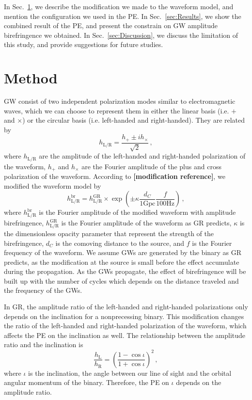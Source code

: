 \documentclass[aps,prd,twocolumn,superscriptaddress,preprintnumbers,floatfix,nofootinbib]{revtex4-2}
\begin{document}
In Sec.~\ref{sec:Method}, we describe the modification we made to the waveform
model, and mention the configuration we used in the PE. In
Sec.~\ref{sec:Results}, we show the combined result of the PE, and present the
constrain on GW amplitude birefringence we obtained. In
Sec.~\ref{sec:Discussion}, we discuss the limitation of this study, and provide
suggestions for future studies.

\section{Method}
\label{sec:Method}
GW consist of two independent polarization modes similar to electromagnetic waves,
which we can choose to represent them in either the linear basis (i.e. $+$ and $\times$)
or the circular basis (i.e. left-handed and right-handed).
They are related by
\begin{equation}
    h_{\mathrm{L/R}} = \frac{h_+ \pm i h_\times}{\sqrt{2}}\,,
\end{equation}
where $h_{\mathrm{L/R}}$ are the amplitude of the left-handed and right-handed
polarization of the waveform, $h_+$ and $h_\times$ are the Fourier amplitude of
the plus and cross polarization of the waveform. According to
\textbf{[modification reference]}, we modified the waveform model by
\begin{equation}
    h_\mathrm{L/R}^{\mathrm{br}}=
    h_\mathrm{L/R}^{\mathrm{GR}}\times
    \exp\left(\pm\kappa\frac{d_C}{1\mathrm{Gpc}}\frac{f}{100\mathrm{Hz}}\right)\,,
\end{equation}
where $h_\mathrm{L/R}^{\mathrm{br}}$ is the Fourier amplitude of the modified
waveform with amplitude birefringence, $h_\mathrm{L/R}^{\mathrm{GR}}$ is the
Fourier amplitude of the waveform as GR predicts, $\kappa$ is the dimensionless opacity parameter that
represent the strength of the birefringence, $d_C$ is the comoving distance to
the source, and $f$ is the Fourier frequency of the waveform. We assume GWs are
generated by the binary as GR predicts, as the modification at the source is
small before the effect accumulate during the propagation. As the GWs propagate,
the effect of birefringence will be built up with the number of cycles which
depends on the distance traveled and the frequency of the GWs.

In GR, the amplitude ratio of the left-handed and right-handed polarizations only depends on the inclination for a nonprecessing binary.
This modification changes the ratio of the left-handed and right-handed polarization of the waveform, which affects the PE on the inclination as well.
The relationship between the amplitude ratio and the inclination is
\begin{equation}
    \frac{h_\mathrm{L}}{h_\mathrm{R}}=\left(\frac{1-\cos\iota}{1+\cos\iota}\right)^2\,,
\end{equation}
where $\iota$ is the inclination, the angle between our line of sight and the orbital angular
momentum of the binary. Therefore, the PE on $\iota$ depends on the amplitude ratio.
\end{document}
